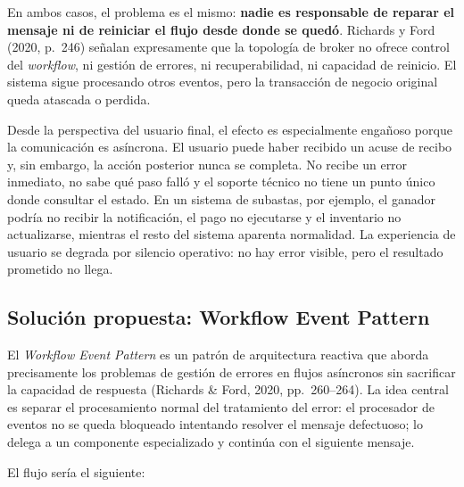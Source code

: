 \documentclass[12pt,a4paper]{article}
\begin{document}
En ambos casos, el problema es el mismo: \textbf{nadie es responsable de reparar el mensaje ni de reiniciar el flujo desde donde se quedó}. Richards y Ford (2020, p.~246) señalan expresamente que la topología de broker no ofrece control del \emph{workflow}, ni gestión de errores, ni recuperabilidad, ni capacidad de reinicio. El sistema sigue procesando otros eventos, pero la transacción de negocio original queda atascada o perdida.

Desde la perspectiva del usuario final, el efecto es especialmente engañoso porque la comunicación es asíncrona. El usuario puede haber recibido un acuse de recibo y, sin embargo, la acción posterior nunca se completa. No recibe un error inmediato, no sabe qué paso falló y el soporte técnico no tiene un punto único donde consultar el estado. En un sistema de subastas, por ejemplo, el ganador podría no recibir la notificación, el pago no ejecutarse y el inventario no actualizarse, mientras el resto del sistema aparenta normalidad. La experiencia de usuario se degrada por silencio operativo: no hay error visible, pero el resultado prometido no llega.

\subsection{Solución propuesta: Workflow Event Pattern}

El \emph{Workflow Event Pattern} es un patrón de arquitectura reactiva que aborda precisamente los problemas de gestión de errores en flujos asíncronos sin sacrificar la capacidad de respuesta (Richards \& Ford, 2020, pp.~260--264). La idea central es separar el procesamiento normal del tratamiento del error: el procesador de eventos no se queda bloqueado intentando resolver el mensaje defectuoso; lo delega a un componente especializado y continúa con el siguiente mensaje.

El flujo sería el siguiente:
\end{document}
